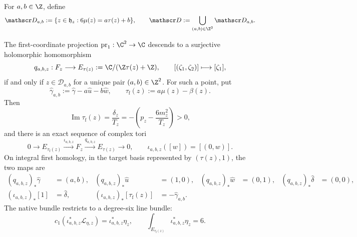 For \(a,b\in\Z\), define
\begin{equation}\label{eq:s6cusp-descent-loci}
 \mathscr D_{a,b}:=
 \{z\in\mathfrak h_z:6\mu(z)=a\tau(z)+b\},
 \qquad
 \mathscr D:=\bigcup_{(a,b)\in\Z^2}\mathscr D_{a,b}.
\end{equation}

\begin{theorem}
\label{thm:s6cusp-exceptional-elliptic-restriction}
The first-coordinate projection \(\operatorname{pr}_1:\C^2\to\C\)
descends to a surjective holomorphic homomorphism
\begin{equation}\label{eq:s6cusp-first-coordinate-quotient}
 q_{a,b,z}:F_z\longrightarrow
 E_{\tau(z)}:=\C/(\Z\tau(z)+\Z),
 \qquad
 [(\zeta_1,\zeta_2)]\longmapsto[\zeta_1],
\end{equation}
if and only if \(z\in\mathscr D_{a,b}\) for a unique pair
\((a,b)\in\Z^2\).  For such a point, put
\begin{equation}\label{eq:s6cusp-exceptional-kernel-parameter}
 \widehat\gamma_{a,b}:=
 \widehat\gamma-a\widehat u-b\widehat w,
 \qquad
 \tau_{\mathrm f}(z):=a\mu(z)-\beta(z).
\end{equation}
Then
\begin{equation}\label{eq:s6cusp-exceptional-kernel-imaginary-part}
 \operatorname{Im}\tau_{\mathrm f}(z)
 =\frac{\delta_z}{T_z}
 =-\left(
 p_z-\frac{6m_z^2}{T_z}
 \right)>0,
\end{equation}
and there is an exact sequence of complex tori
\begin{equation}\label{eq:s6cusp-exceptional-exact-sequence}
 0\longrightarrow E_{\tau_{\mathrm f}(z)}
 \overset{\iota_{a,b,z}}{\longrightarrow}F_z
 \overset{q_{a,b,z}}{\longrightarrow}E_{\tau(z)}
 \longrightarrow0,
 \qquad
 \iota_{a,b,z}([w])=[(0,w)].
\end{equation}
On integral first homology, in the target basis represented by
\((\tau(z),1)\), the two maps are
\begin{align}
 (q_{a,b,z})_*\widehat\gamma&=(a,b),&
 (q_{a,b,z})_*\widehat u&=(1,0),&
 (q_{a,b,z})_*\widehat w&=(0,1),&
 (q_{a,b,z})_*\widehat\delta&=(0,0),
 \label{eq:s6cusp-exceptional-homology-quotient}\\
 (\iota_{a,b,z})_*[1]&=\widehat\delta,&
 (\iota_{a,b,z})_*[\tau_{\mathrm f}(z)]
 &=-\widehat\gamma_{a,b}.
 \label{eq:s6cusp-exceptional-homology-inclusion}
\end{align}
The native bundle restricts to a degree-six line bundle:
\begin{equation}\label{eq:s6cusp-native-restriction-degree}
 c_1(\iota_{a,b,z}^*\mathcal L_{\eta,z})
 =\iota_{a,b,z}^*\eta_z,
 \qquad
 \int_{E_{\tau_{\mathrm f}(z)}}
 \iota_{a,b,z}^*\eta_z=6.
\end{equation}
\end{theorem}

